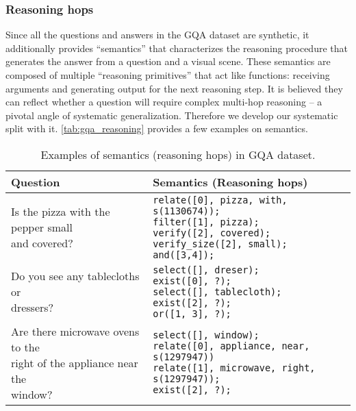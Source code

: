 \documentclass{article} \usepackage{iclr2022_conference,times}
\begin{document}
\subsubsection{Reasoning hops}

Since all the questions and answers in the GQA dataset are synthetic, it additionally provides ``semantics'' that characterizes the reasoning procedure that generates the answer from a question and a visual scene. These semantics are composed of multiple ``reasoning primitives'' that act like functions: receiving arguments and generating output for the next reasoning step. It is believed they can reflect whether a question will require complex multi-hop reasoning -- a pivotal angle of systematic generalization. Therefore we develop our systematic split with it. \autoref{tab:gqa_reasoning} provides a few examples on semantics.

\begin{table}[h]
    \centering
    \begin{tabular}{l|l}
    \toprule
    Question & Semantics (Reasoning hops) \\
    \midrule     
    \makecell[l]{Is the pizza with the pepper small \\and covered?} & \makecell[l]{\small{\texttt{relate([0], pizza, with, s(1130674));}} \\
    \small{\texttt{filter([1], pizza);}} \\
    \small{\texttt{verify([2], covered);}} \\
    \small{\texttt{verify\_size([2], small);}} \\
    \small{\texttt{and([3,4]);}}} \\
    \midrule
    \makecell[l]{Do you see any tablecloths or \\dressers?} & \makecell[l]{
    \small{\texttt{select([], dreser);}}\\
    \small{\texttt{exist([0], ?);}}\\
    \small{\texttt{select([], tablecloth);}}\\
    \small{\texttt{exist([2], ?);}}\\
    \small{\texttt{or([1, 3], ?);}}
    } \\
    \midrule
    \makecell[l]{Are there microwave ovens to the\\ right of the appliance near the\\ window?} & \makecell[l]{\small{\texttt{select([], window);}}\\
    \small{\texttt{relate([0], appliance, near, s(1297947))}} \\
    \small{\texttt{relate([1], microwave, right, s(1297947));}} \\
    \small{\texttt{exist([2], ?);}}
    }\\
    \bottomrule
    \end{tabular}
    \caption{Examples of semantics (reasoning hops) in GQA dataset.}
    \label{tab:gqa_reasoning}
\end{table}
\end{document}
